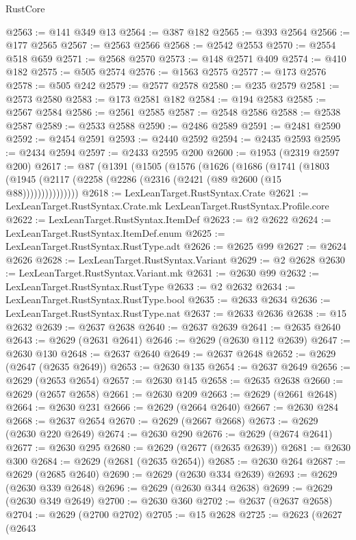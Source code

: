 \begin{lexlean}{RustCore}
\begin{coremodule}
@2563 := @141 @349 @13
@2564 := @387 @182
@2565 := @393 @2564
@2566 := @177 @2565
@2567 := @2563 @2566
@2568 := @2542 @2553
@2570 := @2554 @518 @659
@2571 := @2568 @2570
@2573 := @148 @2571 @409
@2574 := @410 @182
@2575 := @505 @2574
@2576 := @1563 @2575
@2577 := @173 @2576
@2578 := @505 @242
@2579 := @2577 @2578
@2580 := @235 @2579
@2581 := @2573 @2580
@2583 := @173 @2581 @182
@2584 := @194 @2583
@2585 := @2567 @2584
@2586 := @2561 @2585
@2587 := @2548 @2586
@2588 := @2538 @2587
@2589 := @2533 @2588
@2590 := @2486 @2589
@2591 := @2481 @2590
@2592 := @2454 @2591
@2593 := @2440 @2592
@2594 := @2435 @2593
@2595 := @2434 @2594
@2597 := @2433 @2595 @200
@2600 := @1953 (@2319 @2597 @200)
@2617 := @87
    (@1391
      (@1505
        (@1576
          (@1626
            (@1686
              (@1741
                (@1803 (@1945 (@2117 (@2258 (@2286 (@2316 (@2421 (@89 @2600 (@15 @88)))))))))))))))
@2618 := LexLeanTarget.RustSyntax.Crate
@2621 := LexLeanTarget.RustSyntax.Crate.mk LexLeanTarget.RustSyntax.Profile.core
@2622 := LexLeanTarget.RustSyntax.ItemDef
@2623 := @2 @2622
@2624 := LexLeanTarget.RustSyntax.ItemDef.enum
@2625 := LexLeanTarget.RustSyntax.RustType.adt
@2626 := @2625 @99
@2627 := @2624 @2626
@2628 := LexLeanTarget.RustSyntax.Variant
@2629 := @2 @2628
@2630 := LexLeanTarget.RustSyntax.Variant.mk
@2631 := @2630 @99
@2632 := LexLeanTarget.RustSyntax.RustType
@2633 := @2 @2632
@2634 := LexLeanTarget.RustSyntax.RustType.bool
@2635 := @2633 @2634
@2636 := LexLeanTarget.RustSyntax.RustType.nat
@2637 := @2633 @2636
@2638 := @15 @2632
@2639 := @2637 @2638
@2640 := @2637 @2639
@2641 := @2635 @2640
@2643 := @2629 (@2631 @2641)
@2646 := @2629 (@2630 @112 @2639)
@2647 := @2630 @130
@2648 := @2637 @2640
@2649 := @2637 @2648
@2652 := @2629 (@2647 (@2635 @2649))
@2653 := @2630 @135
@2654 := @2637 @2649
@2656 := @2629 (@2653 @2654)
@2657 := @2630 @145
@2658 := @2635 @2638
@2660 := @2629 (@2657 @2658)
@2661 := @2630 @209
@2663 := @2629 (@2661 @2648)
@2664 := @2630 @231
@2666 := @2629 (@2664 @2640)
@2667 := @2630 @284
@2668 := @2637 @2654
@2670 := @2629 (@2667 @2668)
@2673 := @2629 (@2630 @220 @2649)
@2674 := @2630 @290
@2676 := @2629 (@2674 @2641)
@2677 := @2630 @295
@2680 := @2629 (@2677 (@2635 @2639))
@2681 := @2630 @300
@2684 := @2629 (@2681 (@2635 @2654))
@2685 := @2630 @264
@2687 := @2629 (@2685 @2640)
@2690 := @2629 (@2630 @334 @2639)
@2693 := @2629 (@2630 @339 @2648)
@2696 := @2629 (@2630 @344 @2638)
@2699 := @2629 (@2630 @349 @2649)
@2700 := @2630 @360
@2702 := @2637 (@2637 @2658)
@2704 := @2629 (@2700 @2702)
@2705 := @15 @2628
@2725 := @2623
    (@2627
      (@2643

\end{coremodule}
\end{lexlean}
